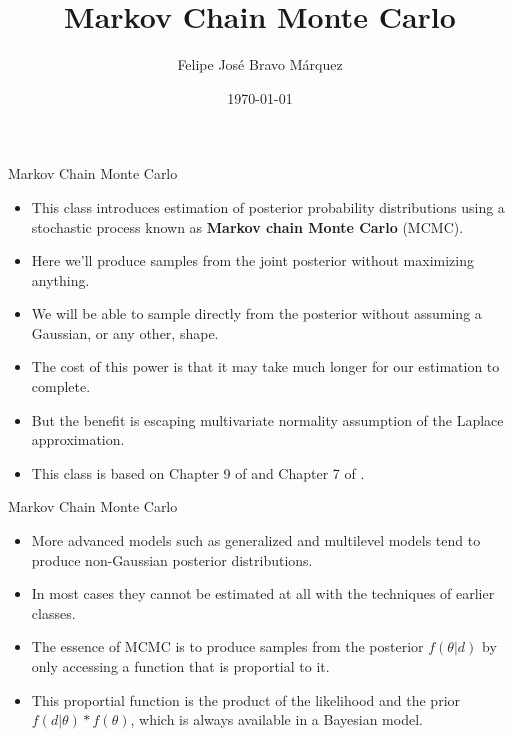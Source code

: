 \documentclass[handout]{beamer}
\title{Markov Chain Monte Carlo}
\author[Felipe Bravo Márquez]{\footnotesize
 \textcolor[rgb]{0.00,0.00,1.00}{Felipe José Bravo Márquez}}
\date{ \today }
\begin{document}
\begin{frame}
\titlepage


\end{frame}




\begin{frame}{Markov Chain Monte Carlo}
\scriptsize{
\begin{itemize}
\item This class  introduces estimation of posterior probability distributions using a stochastic process known
as \textbf{Markov chain Monte Carlo} (MCMC). 

\item Here we'll produce samples from the joint posterior without maximizing anything. 

\item We will be able to sample directly from the posterior without assuming a Gaussian, or any other, shape. 

\item The cost of this power is that it may take much longer for our estimation to complete.

\item But the benefit is escaping multivariate normality assumption of the Laplace approximation.




\item This class is based on Chapter 9 of \cite{mcelreath2020statistical} and Chapter 7 of \cite{kruschke2014doing}.
 
\end{itemize}



} 

\end{frame}




\begin{frame}{Markov Chain Monte Carlo}
\scriptsize{
\begin{itemize}

\item More advanced models such as generalized and multilevel models tend to produce non-Gaussian posterior distributions.

\item In most cases  they cannot be estimated at all with the techniques of earlier classes.

\item The essence of MCMC is to produce samples from the posterior $f(\theta|d)$ by only accessing a function that is proportial to it.
\item This proportial function is the product of the likelihood and the prior $f(d|\theta)*f(\theta)$, which is always available in a Bayesian model.

 
\end{itemize}



} 

\end{frame}
\end{document}
